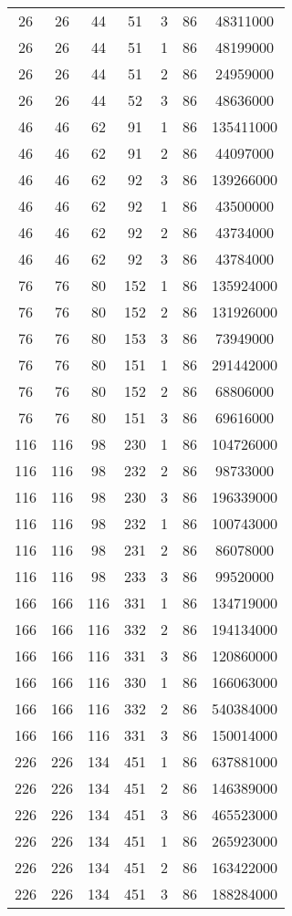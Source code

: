 \documentclass[a4paper,11pt]{article}
\begin{document}
\begin{longtable}{ |c|c|c|c|c|c|c| }
26 & 26 & 44 & 51 & 3 & 86 & 48311000 \\
26 & 26 & 44 & 51 & 1 & 86 & 48199000 \\
26 & 26 & 44 & 51 & 2 & 86 & 24959000 \\
26 & 26 & 44 & 52 & 3 & 86 & 48636000 \\
46 & 46 & 62 & 91 & 1 & 86 & 135411000 \\
46 & 46 & 62 & 91 & 2 & 86 & 44097000 \\
46 & 46 & 62 & 92 & 3 & 86 & 139266000 \\
46 & 46 & 62 & 92 & 1 & 86 & 43500000 \\
46 & 46 & 62 & 92 & 2 & 86 & 43734000 \\
46 & 46 & 62 & 92 & 3 & 86 & 43784000 \\
76 & 76 & 80 & 152 & 1 & 86 & 135924000 \\
76 & 76 & 80 & 152 & 2 & 86 & 131926000 \\
76 & 76 & 80 & 153 & 3 & 86 & 73949000 \\
76 & 76 & 80 & 151 & 1 & 86 & 291442000 \\
76 & 76 & 80 & 152 & 2 & 86 & 68806000 \\
76 & 76 & 80 & 151 & 3 & 86 & 69616000 \\
116 & 116 & 98 & 230 & 1 & 86 & 104726000 \\
116 & 116 & 98 & 232 & 2 & 86 & 98733000 \\
116 & 116 & 98 & 230 & 3 & 86 & 196339000 \\
116 & 116 & 98 & 232 & 1 & 86 & 100743000 \\
116 & 116 & 98 & 231 & 2 & 86 & 86078000 \\
116 & 116 & 98 & 233 & 3 & 86 & 99520000 \\
166 & 166 & 116 & 331 & 1 & 86 & 134719000 \\
166 & 166 & 116 & 332 & 2 & 86 & 194134000 \\
166 & 166 & 116 & 331 & 3 & 86 & 120860000 \\
166 & 166 & 116 & 330 & 1 & 86 & 166063000 \\
166 & 166 & 116 & 332 & 2 & 86 & 540384000 \\
166 & 166 & 116 & 331 & 3 & 86 & 150014000 \\
226 & 226 & 134 & 451 & 1 & 86 & 637881000 \\
226 & 226 & 134 & 451 & 2 & 86 & 146389000 \\
226 & 226 & 134 & 451 & 3 & 86 & 465523000 \\
226 & 226 & 134 & 451 & 1 & 86 & 265923000 \\
226 & 226 & 134 & 451 & 2 & 86 & 163422000 \\
226 & 226 & 134 & 451 & 3 & 86 & 188284000 \\
 
 

      \hline
    \end{longtable}
    
\end{document}
